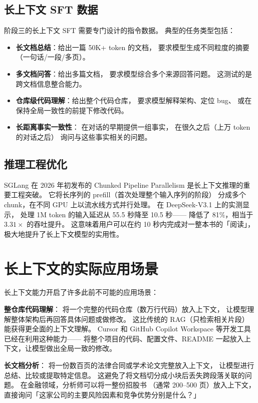 \subsection{长上下文 SFT 数据}

阶段三的长上下文 SFT 需要专门设计的指令数据。
典型的任务类型包括：
\begin{itemize}[noitemsep]
  \item \textbf{长文档总结}：给出一篇 50K+ token 的文档，
        要求模型生成不同粒度的摘要（一句话/一段/多页）。
  \item \textbf{多文档问答}：给出多篇文档，
        要求模型综合多个来源回答问题。
        这测试的是跨文档信息整合能力。
  \item \textbf{仓库级代码理解}：给出整个代码仓库，
        要求模型解释架构、定位 bug、
        或在保持全局一致性的前提下修改代码。
  \item \textbf{长距离事实一致性}：
        在对话的早期提供一组事实，
        在很久之后（上万 token 的对话之后）
        询问与这些事实相关的问题。
\end{itemize}

\subsection{推理工程优化}

SGLang 在 2026 年初发布的 Chunked Pipeline Parallelism
是长上下文推理的重要工程突破。
它将长序列的 prefill（首次处理整个输入序列的阶段）
分成多个 chunk，在不同 GPU 上以流水线方式并行处理。
在 DeepSeek-V3.1 上的实测显示，
处理 1M token 的输入延迟从 55.5 秒降至 10.5 秒——
降低了 81\%，相当于 $3.31\times$ 的吞吐提升。
这意味着用户可以在约 10 秒内完成对一整本书的「阅读」，
极大地提升了长上下文模型的实用性。

\section{长上下文的实际应用场景}

长上下文能力开启了许多此前不可能的应用场景：

\textbf{整仓库代码理解}：
将一个完整的代码仓库（数万行代码）放入上下文，
让模型理解整体架构后再回答具体问题或做修改。
这比传统的 RAG（只检索相关片段）
能获得更全面的上下文理解。
Cursor 和 GitHub Copilot Workspace 等开发工具
已经在利用这种能力——
将整个项目的代码、配置文件、README
一起放入上下文，让模型做出全局一致的修改。

\textbf{长文档分析}：
将一份数百页的法律合同或学术论文完整放入上下文，
让模型进行总结、比较或提取特定信息。
这避免了将文档切分成小块后丢失跨段落关联的问题。
在金融领域，分析师可以将一整份招股书
（通常 200--500 页）放入上下文，
直接询问「这家公司的主要风险因素和竞争优势分别是什么？」

